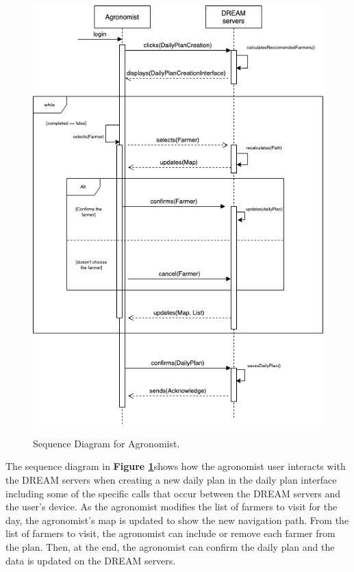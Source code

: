 \begin{figure}[hpt!]
\centering
\includegraphics[scale=0.5]{Files/sequence_disgrams/thePNGs/agronomist_createPlan.png}\\
\caption{\label{fig:agrSeqCreatePlan}Sequence Diagram for Agronomist.}
\end{figure}
\begin{flushleft}
The sequence diagram in \textbf{Figure \ref{fig:agrSeqCreatePlan}}shows how the agronomist user interacts with the DREAM servers when creating a new daily plan in the daily plan interface including some of the specific calls that occur between the DREAM servers and the user's device. As the agronomist modifies the list of farmers to visit for the day, the agronomist's map is updated to show the new navigation path. From the list of farmers to visit, the agronomist can include or remove each farmer from the plan. Then, at the end, the agronomist can confirm the daily plan and the data is updated on the DREAM servers.
\end{flushleft}


